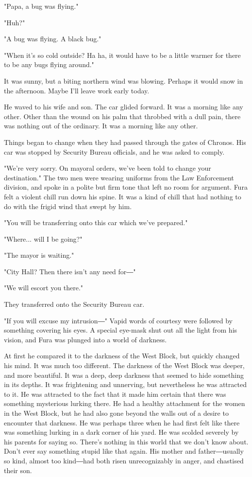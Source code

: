"Papa, a bug was flying."

"Huh?"

"A bug was flying. A black bug."

"When it's so cold outside? Ha ha, it would have to be a little warmer
for there to be any bugs flying around."

It was sunny, but a biting northern wind was blowing. Perhaps it would
snow in the afternoon. Maybe I'll leave work early today.

He waved to his wife and son. The car glided forward. It was a morning
like any other. Other than the wound on his palm that throbbed with a
dull pain, there was nothing out of the ordinary. It was a morning like
any other.

Things began to change when they had passed through the gates of
Chronos. His car was stopped by Security Bureau officials, and he was
asked to comply.

"We're very sorry. On mayoral orders, we've been told to change your
destination." The two men were wearing uniforms from the Law Enforcement
division, and spoke in a polite but firm tone that left no room for
argument. Fura felt a violent chill run down his spine. It was a kind of
chill that had nothing to do with the frigid wind that swept by him.

"You will be transferring onto this car which we've prepared."

"Where... will I be going?"

"The mayor is waiting."

"City Hall? Then there isn't any need for―"

"We will escort you there."

They transferred onto the Security Bureau car.

"If you will excuse my intrusion―" Vapid words of courtesy were followed
by something covering his eyes. A special eye-mask shut out all the
light from his vision, and Fura was plunged into a world of darkness.

At first he compared it to the darkness of the West Block, but quickly
changed his mind. It was much too different. The darkness of the West
Block was deeper, and more beautiful. It was a deep, deep darkness that
seemed to hide something in its depths. It was frightening and
unnerving, but nevertheless he was attracted to it. He was attracted to
the fact that it made him certain that there was something mysterious
lurking there. He had a healthy attachment for the women in the West
Block, but he had also gone beyond the walls out of a desire to
encounter that darkness. He was perhaps three when he had first felt
like there was something lurking in a dark corner of his yard. He was
scolded severely by his parents for saying so. There's nothing in this
world that we don't know about. Don't ever say something stupid like
that again. His mother and father―usually so kind, almost too kind―had
both risen unrecognizably in anger, and chastised their son.

